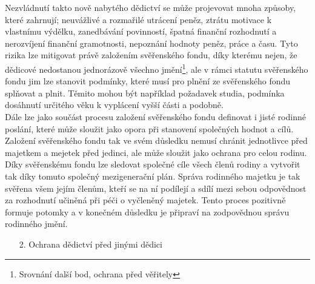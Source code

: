 \documentclass{article}
\begin{document}
 Nezvládnutí takto nově nabytého dědictví se může projevovat mnoha způsoby, které zahrnují; neuvážlivé a rozmařilé utrácení peněz, ztrátu motivace k vlastnímu výdělku, zanedbávání povinností, špatná finanční rozhodnutí a nerozvíjení finanční gramotnosti, nepoznání hodnoty peněz, práce a času. Tyto rizika lze mitigovat právě založením svěřenského fondu, díky kterému nejen, že dědicové nedostanou jednorázově všechno jmění\footnote{Srovnání další bod, ochrana před věřitely}, ale v rámci statutu svěřenského fondu jim lze stanovit podmínky, které musí pro plnění ze svěřenského fondu splňovat a plnit. Těmito mohou být například požadavek studia, podmínka dosáhnutí určitého věku k vyplácení vyšší části a podobně.\\
 
 Dále lze jako součást procesu založení svěřenského fondu definovat i jisté rodinné poslání, které může sloužit jako opora při stanovení společných hodnot a cílů. Založení svěřenského fondu tak ve svém důsledku nemusí chránit jednotlivce před majetkem a mejetek před jedinci, ale může sloužit jako ochrana pro celou rodinu. Díky svěřenskému fondu lze sledovat společné cíle všech členů rodiny a vytvořit tak díky tomuto společný mezigenerační plán. Správa rodinného majetku je tak svěřena všem jejím členům, kteří se na ní podílejí a sdílí mezi sebou odpovědnost za rozhodnutí učiněná při péči o vyčleněn\-ý majetek. Tento proces pozitivně formuje potomky a v konečném důsledku je připraví na zodpovědnou správu rodinného jmění.\\
 
 \begin{enumerate}
 \item[2.] Ochrana dědictví před jinými dědici
 \end{enumerate}
 
\end{document}
